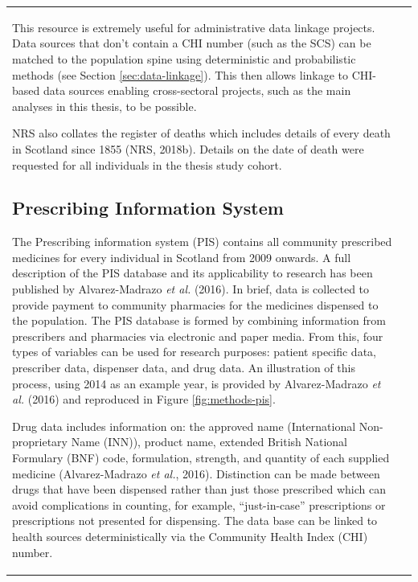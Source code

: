 \documentclass[12pt,a4paper,oneside,table]{report}
\begin{document}
\begin{tabular}[t]{ll}
This resource is extremely useful for administrative data linkage
projects. Data sources that don't contain a CHI number (such as the SCS)
can be matched to the population spine using deterministic and
probabilistic methods (see Section \ref{sec:data-linkage}). This then
allows linkage to CHI-based data sources enabling cross-sectoral
projects, such as the main analyses in this thesis, to be possible.

NRS also collates the register of deaths which includes details of every
death in Scotland since 1855 (NRS, 2018b). Details on the date of death
were requested for all individuals in the thesis study cohort.

\subsection{Prescribing Information System}\label{subsec:source-pis}

The Prescribing information system (PIS) contains all community
prescribed medicines for every individual in Scotland from 2009 onwards.
A full description of the PIS database and its applicability to research
has been published by Alvarez-Madrazo \emph{et al.} (2016). In brief,
data is collected to provide payment to community pharmacies for the
medicines dispensed to the population. The PIS database is formed by
combining information from prescribers and pharmacies via electronic and
paper media. From this, four types of variables can be used for research
purposes: patient specific data, prescriber data, dispenser data, and
drug data. An illustration of this process, using 2014 as an example
year, is provided by Alvarez-Madrazo \emph{et al.} (2016) and reproduced
in Figure \ref{fig:methods-pis}.

Drug data includes information on: the approved name (International
Non-proprietary Name (INN)), product name, extended British National
Formulary (BNF) code, formulation, strength, and quantity of each
supplied medicine (Alvarez-Madrazo \emph{et al.}, 2016). Distinction can
be made between drugs that have been dispensed rather than just those
prescribed which can avoid complications in counting, for example,
``just-in-case'' prescriptions or prescriptions not presented for
dispensing. The data base can be linked to health sources
deterministically via the Community Health Index (CHI) number.


\end{tabular}
\end{document}
